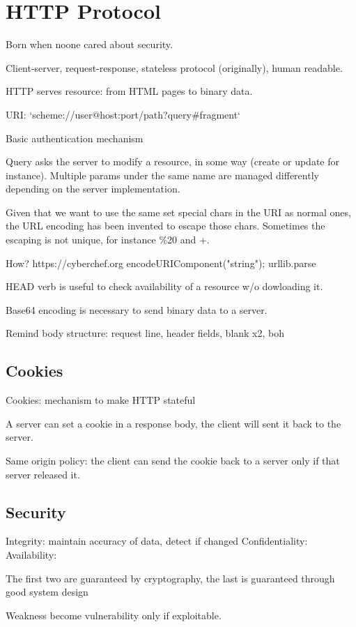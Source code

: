 \section{HTTP Protocol}
Born when noone cared about security.

Client-server, request-response, stateless protocol (originally), human readable.

HTTP serves resource: from HTML pages to binary data.

URI: `scheme://user@host:port/path?query#fragment`

Basic authentication mechanism

Query asks the server to modify a resource, in some way (create or update for instance). Multiple params under the same name are managed differently depending on the server implementation.

Given that we want to use the same set special chars in the URI as normal ones, the URL encoding has been invented to escape those chars.
Sometimes the escaping is not unique, for instance \%20 and +.

How?
https://cyberchef.org
encodeURIComponent("string");
urllib.parse

HEAD verb is useful to check availability of a resource w/o dowloading it.

Base64 encoding is necessary to send binary data to a server.

Remind body structure: request line, header fields, blank x2, boh

\subsection{Cookies}
Cookies: mechanism to make HTTP stateful

A server can set a cookie in a response body, the client will sent it back to the server.

Same origin policy: the client can send the cookie back to a server only if that server released it.

\subsection{Security}
Integrity: maintain accuracy of data, detect if changed
Confidentiality: 
Availability:

The first two are guaranteed by cryptography, the last is guaranteed through good system design

Weakness become vulnerability only if exploitable.

